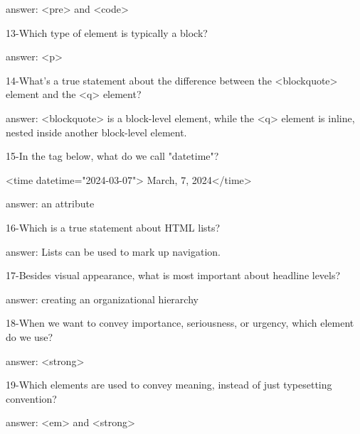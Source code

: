 answer: <pre> and <code>

13-Which type of element is typically a block?

answer: <p>

14-What's a true statement about the difference between the <blockquote> element and the <q> element?

answer: <blockquote> is a block-level element, while the <q> element is inline, nested inside another block-level element.

15-In the tag below, what do we call "datetime"? 

<time datetime="2024-03-07"> March, 7, 2024</time>

answer: an attribute

16-Which is a true statement about HTML lists?

answer: Lists can be used to mark up navigation.

17-Besides visual appearance, what is most important about headline levels?

answer: creating an organizational hierarchy

18-When we want to convey importance, seriousness, or urgency, which element do we use?

answer: <strong>

19-Which elements are used to convey meaning, instead of just typesetting convention?

answer: <em> and <strong>
